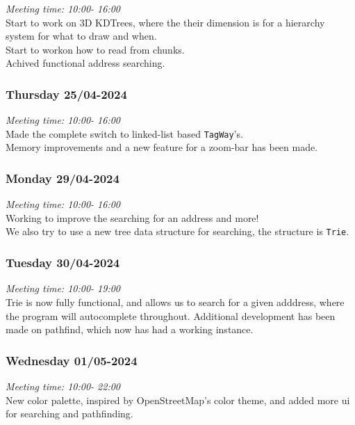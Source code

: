\emph{Meeting time: 10:00- 16:00 }\\
Start to work on 3D KDTrees, where the their dimension is for a
hierarchy system for what to draw and when.\\
Start to workon how to read from chunks.\\
Achived functional address searching.

\hypertarget{thursday-2504-2024}{%
\subsubsection*{Thursday 25/04-2024}\label{thursday-2504-2024}}

\emph{Meeting time: 10:00- 16:00 }\\
Made the complete switch to linked-list based \texttt{TagWay}'s.\\
Memory improvements and a new feature for a zoom-bar has been made.

\hypertarget{monday-2904-2024}{%
\subsubsection*{Monday 29/04-2024}\label{monday-2904-2024}}

\emph{Meeting time: 10:00- 16:00 }\\
Working to improve the searching for an address and more!\\
We also try to use a new tree data structure for searching, the
structure is \texttt{Trie}.

\hypertarget{tuesday-3004-2024}{%
\subsubsection*{Tuesday 30/04-2024}\label{tuesday-3004-2024}}

\emph{Meeting time: 10:00- 19:00 }\\
Trie is now fully functional, and allows us to search for a given
adddress, where the program will autocomplete throughout. Additional
development has been made on pathfind, which now has had a working
instance.

\hypertarget{wednesday-0105-2024}{%
\subsubsection*{Wednesday 01/05-2024}\label{wednesday-0105-2024}}

\emph{Meeting time: 10:00- 22:00 }\\
New color palette, inspired by OpenStreetMap's color theme, and added
more ui for searching and pathfinding.

